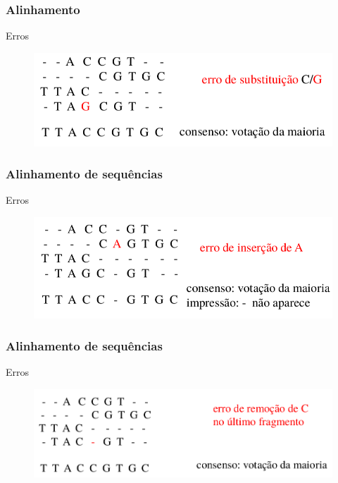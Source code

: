 \documentclass{beamer}
\begin{document}
	\begin{frame}\frametitle{Alinhamento}
	\begin{block}{Erros}
		\begin{figure}[hbtp]
			\centering
			\includegraphics[scale=0.35]{img/erroSubstituicao.png}
		\end{figure}
	\end{block}
	\end{frame}
	\begin{frame}\frametitle{Alinhamento de sequências}
	\begin{block}{Erros}
	\begin{figure}[hbtp]
		\centering
		\includegraphics[scale=0.35]{img/erroInsercao.png}
	\end{figure}
	\end{block}
	\end{frame}
	\begin{frame}\frametitle{Alinhamento de sequências}
	\begin{block}{Erros}
	\begin{figure}[hbtp]
	\centering
	\includegraphics[scale=0.35]{img/erroRemocao.png}
	\end{figure}
	\end{block}
	\end{frame}
\end{document}
